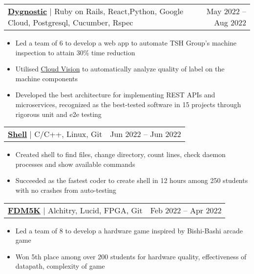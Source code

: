 \documentclass[letterpaper,11pt]{article}
\makeatletter
\newcommand{\resumeItem}[1]{
  \item\small{
    {#1 \vspace{-2.5pt}}
  }
}
\newcommand{\resumeProjectHeading}[2]{
    \item
    \begin{tabular*}{0.97\textwidth}{l@{\extracolsep{\fill}}r}
      \small#1 & \footnotesize#2 \\
    \end{tabular*}\vspace{-7pt}
}
\newcommand{\resumeItemListStart}{\begin{itemize}}
\newcommand{\resumeItemListEnd}{\end{itemize}\vspace{-5pt}}
\makeatother
\begin{document}
      \resumeProjectHeading          {\textbf{{\href{https://sites.google.com/view/group10dynostic}{{\faLink} Dygnostic}}} $|$ {Ruby on Rails, React,Python, Google Cloud, Postgresql, Cucumber, Rspec}}	{May 2022 -- Aug 2022}
          \resumeItemListStart
            \resumeItem{Led a team of 6 to develop a web app to automate TSH Group's machine inspection to attain 30\% time reduction}
            \resumeItem{Utilised \ul{Cloud Vision} to automatically analyze quality of label on the machine components}
            \resumeItem{Developed the best architecture for implementing REST APIs and microservices, recognized as the best-tested software in 15 projects through rigorous unit and e2e testing}
          \resumeItemListEnd

          
           

        \resumeProjectHeading
          {\textbf{{\href{https://github.com/Usgupta/shell}{{\faLink} Shell}}} $|$ {C/C++, Linux, Git}}	{Jun 2022 -- Jun 2022}
          \resumeItemListStart
            \resumeItem{Created shell to find files, change directory, count lines, check daemon processes and show available commands}
            \resumeItem{Succeeded as the fastest coder to create shell in 12 hours among 250 students with no crashes from auto-testing}
          \resumeItemListEnd
          
        \resumeProjectHeading
           {\href{https://youtu.be/lBUOvSejSss} {\faIcon{youtube}}
           \textbf{{\href{https://github.com/Usgupta/50.002-Computation-Structures-1D-Project}{{\faLink} FDM5K}}} $|$ {Alchitry, Lucid, FPGA, Git}}{\footnotesize	{Feb 2022 -- Apr 2022}}
          \resumeItemListStart
            \resumeItem{Led a team of 8 to develop a hardware game inspired by Bishi-Bashi arcade game}
            \resumeItem{Won 5th place among over 200 students for hardware quality, effectiveness of datapath, complexity of game}
          \resumeItemListEnd
\end{document}
